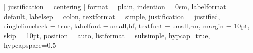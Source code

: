[ %
   justification = centering
]
{ %
   format      = plain,  %
   indention   = 0em,    %
   labelformat = default,%
   labelsep    = colon,  %
   textformat  = simple, %
   justification = justified, %
   singlelinecheck = true, %
   labelfont   = {small,bf},
   textfont    = {small,rm},
%
   margin = 10pt, %
   skip     = 10pt, %
   position = auto, %
   listformat = subsimple, %
	hypcap=true, %
	hypcapspace=0.5\baselineskip
}

\captionsetup{
	style = captionStyleTemplateDefault %
}

\captionsetup[table]{position=top}
\captionsetup[figure]{position=bottom}


\captionsetup[sub]{ %
	style = captionStyleTemplateDefault, %
	skip=6pt,
	margin=5pt,
	labelformat = parens,%
	labelsep    = space,
	list=false,
	hypcap=false
}



%

